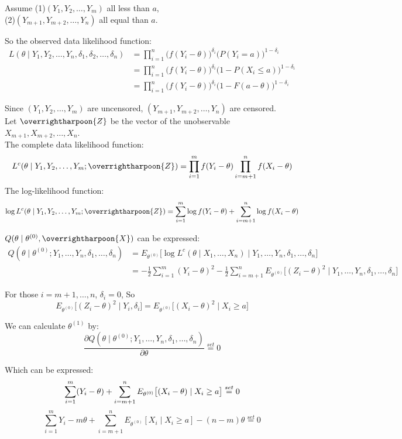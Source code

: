 \documentclass[
  14pt,
]{article}
\begin{document}
Assume (1)\((Y_1, Y_2, \dots, Y_m)\) all less than \(a\),\\
(2)\((Y_{m+1}, Y_{m+2}, \dots, Y_n)\) all equal than \(a\).

So the observed data likelihood function: \[
\begin{aligned}
L(\theta\mid Y_1, Y_2, \dots, Y_n, \delta_1, \delta_2, \dots, \delta_n)&=\prod\limits_{i=1}^{n}\big(f(Y_i-\theta)\big)^{\delta_i}\big(P(Y_i=a)\big)^{1-\delta_i}\\
&=\prod\limits_{i=1}^{n}\big(f(Y_i-\theta)\big)^{\delta_i}\big(1-P(X_i\le a)\big)^{1-\delta_i}\\
&=\prod\limits_{i=1}^{n}\big(f(Y_i-\theta)\big)^{\delta_i}\big(1-F(a-\theta)\big)^{1-\delta_i}
\end{aligned}
\]

Since \((Y_1, Y_2, \dots, Y_m)\) are uncensored,
\((Y_{m+1}, Y_{m+2}, \dots, Y_n)\) are censored.\\
Let \(\overrightharpoon{Z}\) be the vector of the unobservable
\(X_{m+1}, X_{m+2}, \dots, X_n\).\\
The complete data likelihood function: \[
L^c(\theta\mid Y_1, Y_2, \dots, Y_m; \overrightharpoon{Z})=\prod\limits_{i=1}^{m}f(Y_i-\theta)\prod\limits_{i=m+1}^{n}f(X_i-\theta)
\] The log-likelihood function: \[
\log L^c(\theta\mid Y_1, Y_2, \dots, Y_m; \overrightharpoon{Z})=\sum\limits_{i=1}^{m}\log f(Y_i-\theta)+\sum\limits_{i=m+1}^{n}\log f(X_i-\theta)
\]

\(Q(\theta\mid\theta^{(0)},\overrightharpoon{X})\) can be expressed: \[
\begin{aligned}
Q(\theta\mid\theta^{(0)};Y_1, \dots, Y_n, \delta_1, \dots, \delta_n)&=E_{\theta^{(0)}}\big[\log L^c(\theta\mid X_1, \dots, X_n)\mid Y_1, \dots, Y_n, \delta_1, \dots, \delta_n\big]\\
&=-\frac{1}{2}\sum\limits_{i=1}^{m}(Y_i-\theta)^2-\frac{1}{2}\sum\limits_{i=m+1}^{n}E_{\theta^{(0)}}\big[(Z_i-\theta)^2\mid Y_1, \dots, Y_n, \delta_1, \dots, \delta_n\big]
\end{aligned}
\]

For those \(i=m+1, \dots, n\), \(\delta_i=0\), So\\
\[
E_{\theta^{(0)}}\big[(Z_i-\theta)^2\mid Y_i, \delta_i\big]=E_{\theta^{(0)}}\big[(X_i-\theta)^2\mid X_i\ge a \big]
\]

We can calculate \(\theta^{(1)}\) by: \[
\frac{\partial Q(\theta\mid\theta^{(0)};Y_1, \dots, Y_n, \delta_1, \dots, \delta_n)}{\partial\theta}\overset{set}{=}0
\]

Which can be expressed: \[
\sum\limits_{i=1}^{m}(Y_i-\theta)+\sum\limits_{i=m+1}^{n}E_{\theta^{(0)}}\big[(X_i-\theta)\mid X_i\ge a\big]\overset{set}{=}0  \\
\] \[
\sum\limits_{i=1}^{m}Y_i-m\theta+\sum\limits_{i=m+1}^{n}E_{\theta^{(0)}}[X_i\mid X_i\ge a]-(n-m)\theta\overset{set}{=}0 
\]
\end{document}
